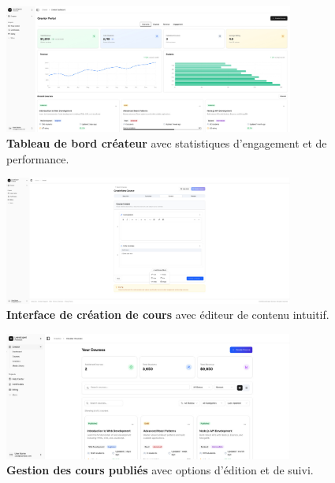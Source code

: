 \begin{figure}[H]
  \centering
  \includegraphics[width=0.85\textwidth,keepaspectratio]{old-reports/week_4_img/cdash.jpeg}
  \caption{\textbf{Tableau de bord créateur} avec statistiques d'engagement et de performance.}
  \label{fig:creator_dashboard}
\end{figure}

\begin{figure}[H]
  \centering
  \includegraphics[width=0.85\textwidth,keepaspectratio]{old-reports/week_4_img/create_course.jpeg}
  \caption{\textbf{Interface de création de cours} avec éditeur de contenu intuitif.}
  \label{fig:course_creator}
\end{figure}

\begin{figure}[H]
  \centering
  \includegraphics[width=0.85\textwidth,keepaspectratio]{old-reports/week_4_img/your_courses.jpeg}
  \caption{\textbf{Gestion des cours publiés} avec options d'édition et de suivi.}
  \label{fig:courses_management}
\end{figure}

